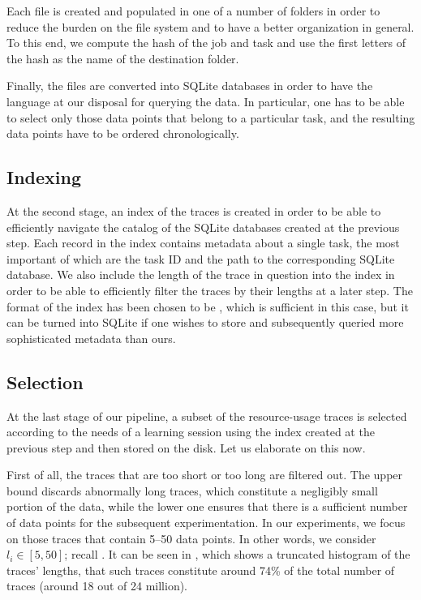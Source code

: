 Each  file is created and populated in one of a number of folders in
order to reduce the burden on the file system and to have a better organization
in general. To this end, we compute the  hash of the job and task
 and use the first letters of the hash as the name of the destination
folder.

Finally, the  files are converted into SQLite databases in order to have
the  language at our disposal for querying the data. In particular, one
has to be able to select only those data points that belong to a particular
task, and the resulting data points have to be ordered chronologically.

\subsection{Indexing} 
At the second stage, an index of the traces is created in order to be able to
efficiently navigate the catalog of the SQLite databases created at the previous
step. Each record in the index contains metadata about a single task, the most
important of which are the task ID and the path to the corresponding SQLite
database. We also include the length of the trace in question into the index in
order to be able to efficiently filter the traces by their lengths at a later
step. The format of the index has been chosen to be , which is
sufficient in this case, but it can be turned into SQLite if one wishes to store
and subsequently queried more sophisticated metadata than ours.

\subsection{Selection} 
At the last stage of our pipeline, a subset of the resource-usage traces is
selected according to the needs of a learning session using the index created at
the previous step and then stored on the disk. Let us elaborate on this now.


First of all, the traces that are too short or too long are filtered out. The
upper bound discards abnormally long traces, which constitute a negligibly small
portion of the data, while the lower one ensures that there is a sufficient
number of data points for the subsequent experimentation. In our experiments, we
focus on those traces that contain 5--50 data points. In other words, we
consider $l_i \in [5, 50]$; recall . It can be seen in
, which shows a truncated histogram of the traces' lengths, that
such traces constitute around 74\% of the total number of traces (around 18 out
of 24 million).

